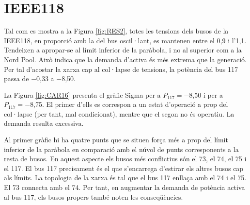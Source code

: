 \section{IEEE118}
Tal com es mostra a la Figura \ref{fig:RES2}, totes les tensions dels busos de la IEEE118, en proporció amb la del bus oscil·lant, es mantenen entre el 0,9 i l'1,1. Tendeixen a apropar-se al límit inferior de la paràbola, i no al superior com a la Nord Pool. Això indica que la demanda d'activa és més extrema que la generació. Per tal d'acostar la xarxa cap al col·lapse de tensions, la potència del bus 117 passa de $-$0,33 a $-$8,50.

La Figura \ref{fig:CAR16} presenta el gràfic Sigma per a $P_{117}=-$8,50 i per a $P_{117}=-$8,75. El primer d'ells es correspon a un estat d'operació a prop del col·lapse (per tant, mal condicionat), mentre que el segon no és operatiu. La demanda resulta excessiva. 

Al primer gràfic hi ha quatre punts que se situen força més a prop del límit inferior de la paràbola en comparació amb el núvol de punts corresponents a la resta de busos. En aquest aspecte els busos més conflictius són el 73, el 74, el 75 i el 117. El bus 117 precisament és el que s'encarrega d'estirar els altres busos cap als límits. La topologia de la xarxa és tal que el bus 117 enllaça amb el 74 i el 75. El 73 connecta amb el 74. Per tant, en augmentar la demanda de potència activa al bus 117, els busos propers també noten les conseqüències.

